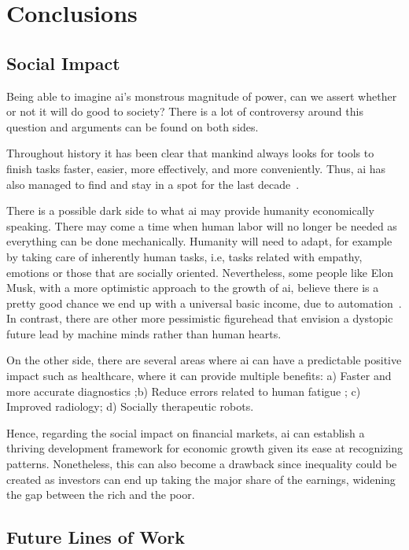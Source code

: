\chapter{Conclusions}
\label{con:conclusions}
\section{Social Impact}
\label{imp:impacto}

Being able to imagine \gls{ai}'s monstrous magnitude of power, can we assert whether or not it will do good to society? There is a lot of controversy around this question and arguments can be found on both sides.

Throughout history it has been clear that mankind always looks for tools to finish tasks faster, easier, more effectively, and more conveniently. Thus, \gls{ai} has also managed to find and stay in a spot for the last decade~\cite{tai2020impact}.

There is a possible dark side to what \gls{ai} may provide humanity economically speaking. There may come a time when human labor will no longer be needed as everything can be done mechanically. Humanity will need to adapt, for example by taking care of inherently human tasks, i.e, tasks related with empathy, emotions or those that are socially oriented. Nevertheless, some people like Elon Musk, with a more optimistic approach to the growth of \gls{ai}, believe there is a pretty good chance we end up with a universal basic income, due to automation~\cite{elonBasicIncome}. In contrast, there are other more pessimistic figurehead that envision a dystopic future lead by machine minds rather than human hearts.

On the other side, there are several areas where \gls{ai} can have a predictable positive impact such as healthcare, where it can provide multiple benefits: a) Faster and more accurate diagnostics ;b) Reduce errors related to human fatigue ; c) Improved radiology; d) Socially therapeutic robots.

Hence, regarding the social impact on financial markets, \gls{ai} can establish a thriving development framework for economic growth given its ease at recognizing patterns. Nonetheless, this can also become a drawback since inequality could be created as investors can end up taking the major share of the earnings, widening the gap between the rich and the poor.

\section{Future Lines of Work}
\label{fu:future}

